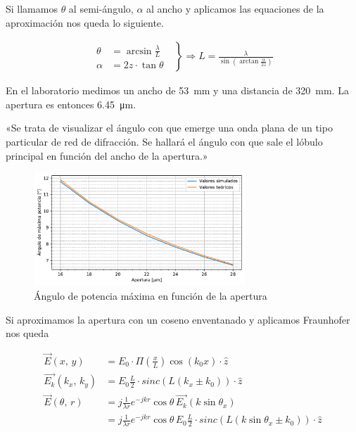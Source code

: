 \documentclass[spanish, a4paper, nobib]{tufte-handout}
\begin{document}
Si llamamos $\theta$ al semi-ángulo, $\alpha$ al ancho y aplicamos las equaciones de la aproximación nos queda lo siguiente.

\begin{align}
    \left.
        \begin{aligned}
            \theta &= \arcsin{\frac{\lambda}{L}}\quad \\
            \alpha &= 2 z \cdot \tan{\theta}
        \end{aligned}
    \right\} \Rightarrow L = \frac{\lambda}{\sin{\left(\arctan{\frac{\alpha}{2 z}}\right)}}
\end{align}

En el laboratorio medimos un ancho de \qty{53}{\milli\meter} y una distancia de \qty{320}{\milli\meter}. La apertura es entonces \qty{6.45}{\micro\meter}.

\newpage


«Se trata de visualizar el ángulo con que emerge una onda plana de un tipo particular de red de difracción. Se hallará el ángulo con que sale el lóbulo principal en función del ancho de la apertura.»

\begin{figure}[h]
    \begin{center}
        \includegraphics[width=300px]{p3.pdf}
    \end{center}
    \caption{Ángulo de potencia máxima en función de la apertura}
    \label{fig:p3}
\end{figure}

Si aproximamos la apertura con un coseno enventanado y aplicamos Fraunhofer nos queda

\begin{align}
    \vec{E}(x,\,y) &= E_0\cdot\Pi\left(\frac{x}{L}\right)\cos{(k_0 x)} \cdot \hat{z} \\
    \vec{E_k}(k_x,\,k_y) &= E_0\frac{L}{2}\cdot sinc\left(L(k_x \pm k_0)\right) \cdot \hat{z} \\
    \vec{E}(\theta ,\, r) &= j\frac{1}{\lambda r}e^{-j k r} \cos{\theta}\, \vec{E_k}(k\sin\theta_x) \\
    &= j\frac{1}{\lambda r}e^{-j k r} \cos{\theta} \,E_0\frac{L}{2}\cdot sinc\left(L(k\sin\theta_x \pm k_0)\right) \cdot \hat{z}
\end{align}
\end{document}
